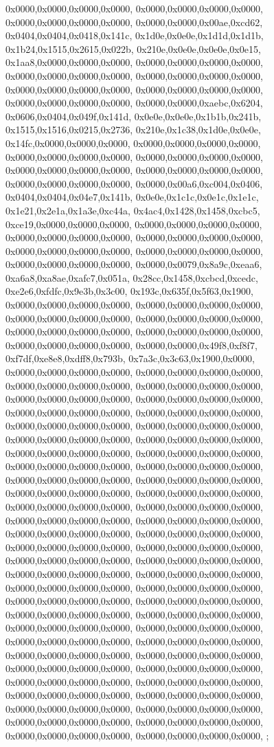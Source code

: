 {	0x0000,0x0000,0x0000,0x0000,
	0x0000,0x0000,0x0000,0x0000,
	0x0000,0x0000,0x0000,0x0000,
	0x0000,0x0000,0x00ae,0xcd62,
	0x0404,0x0404,0x0418,0x141c,
	0x1d0e,0x0e0e,0x1d1d,0x1d1b,
	0x1b24,0x1515,0x2615,0x022b,
	0x210e,0x0e0e,0x0e0e,0x0e15,
	0x1aa8,0x0000,0x0000,0x0000,
	0x0000,0x0000,0x0000,0x0000,
	0x0000,0x0000,0x0000,0x0000,
	0x0000,0x0000,0x0000,0x0000,
	0x0000,0x0000,0x0000,0x0000,
	0x0000,0x0000,0x0000,0x0000,
	0x0000,0x0000,0x0000,0x0000,
	0x0000,0x0000,0xaebc,0x6204,
	0x0606,0x0404,0x049f,0x141d,
	0x0e0e,0x0e0e,0x1b1b,0x241b,
	0x1515,0x1516,0x0215,0x2736,
	0x210e,0x1c38,0x1d0e,0x0e0e,
	0x14fc,0x0000,0x0000,0x0000,
	0x0000,0x0000,0x0000,0x0000,
	0x0000,0x0000,0x0000,0x0000,
	0x0000,0x0000,0x0000,0x0000,
	0x0000,0x0000,0x0000,0x0000,
	0x0000,0x0000,0x0000,0x0000,
	0x0000,0x0000,0x0000,0x0000,
	0x0000,0x00a6,0xc004,0x0406,
	0x0404,0x0404,0x04e7,0x141b,
	0x0e0e,0x1c1c,0x0e1c,0x1e1c,
	0x1e21,0x2e1a,0x1a3e,0xc44a,
	0x4ac4,0x1428,0x1458,0xcbc5,
	0xce19,0x0000,0x0000,0x0000,
	0x0000,0x0000,0x0000,0x0000,
	0x0000,0x0000,0x0000,0x0000,
	0x0000,0x0000,0x0000,0x0000,
	0x0000,0x0000,0x0000,0x0000,
	0x0000,0x0000,0x0000,0x0000,
	0x0000,0x0000,0x0000,0x0000,
	0x0000,0x0079,0x8a9c,0xeaa6,
	0xa6a8,0xa8ae,0xafc7,0x051a,
	0x28cc,0x1458,0xcbcd,0xcedc,
	0xe2e6,0xfdfc,0x9e3b,0x3c00,
	0x193c,0x635f,0x5f63,0x1900,
	0x0000,0x0000,0x0000,0x0000,
	0x0000,0x0000,0x0000,0x0000,
	0x0000,0x0000,0x0000,0x0000,
	0x0000,0x0000,0x0000,0x0000,
	0x0000,0x0000,0x0000,0x0000,
	0x0000,0x0000,0x0000,0x0000,
	0x0000,0x0000,0x0000,0x0000,
	0x0000,0x0000,0x49f8,0xf8f7,
	0xf7df,0xe8e8,0xdff8,0x793b,
	0x7a3c,0x3c63,0x1900,0x0000,
	0x0000,0x0000,0x0000,0x0000,
	0x0000,0x0000,0x0000,0x0000,
	0x0000,0x0000,0x0000,0x0000,
	0x0000,0x0000,0x0000,0x0000,
	0x0000,0x0000,0x0000,0x0000,
	0x0000,0x0000,0x0000,0x0000,
	0x0000,0x0000,0x0000,0x0000,
	0x0000,0x0000,0x0000,0x0000,
	0x0000,0x0000,0x0000,0x0000,
	0x0000,0x0000,0x0000,0x0000,
	0x0000,0x0000,0x0000,0x0000,
	0x0000,0x0000,0x0000,0x0000,
	0x0000,0x0000,0x0000,0x0000,
	0x0000,0x0000,0x0000,0x0000,
	0x0000,0x0000,0x0000,0x0000,
	0x0000,0x0000,0x0000,0x0000,
	0x0000,0x0000,0x0000,0x0000,
	0x0000,0x0000,0x0000,0x0000,
	0x0000,0x0000,0x0000,0x0000,
	0x0000,0x0000,0x0000,0x0000,
	0x0000,0x0000,0x0000,0x0000,
	0x0000,0x0000,0x0000,0x0000,
	0x0000,0x0000,0x0000,0x0000,
	0x0000,0x0000,0x0000,0x0000,
	0x0000,0x0000,0x0000,0x0000,
	0x0000,0x0000,0x0000,0x0000,
	0x0000,0x0000,0x0000,0x0000,
	0x0000,0x0000,0x0000,0x0000,
	0x0000,0x0000,0x0000,0x0000,
	0x0000,0x0000,0x0000,0x0000,
	0x0000,0x0000,0x0000,0x0000,
	0x0000,0x0000,0x0000,0x0000,
	0x0000,0x0000,0x0000,0x0000,
	0x0000,0x0000,0x0000,0x0000,
	0x0000,0x0000,0x0000,0x0000,
	0x0000,0x0000,0x0000,0x0000,
	0x0000,0x0000,0x0000,0x0000,
	0x0000,0x0000,0x0000,0x0000,
	0x0000,0x0000,0x0000,0x0000,
	0x0000,0x0000,0x0000,0x0000,
	0x0000,0x0000,0x0000,0x0000,
	0x0000,0x0000,0x0000,0x0000,
	0x0000,0x0000,0x0000,0x0000,
	0x0000,0x0000,0x0000,0x0000,
	0x0000,0x0000,0x0000,0x0000,
	0x0000,0x0000,0x0000,0x0000,
	0x0000,0x0000,0x0000,0x0000,
	0x0000,0x0000,0x0000,0x0000,
	0x0000,0x0000,0x0000,0x0000,
	0x0000,0x0000,0x0000,0x0000,
	0x0000,0x0000,0x0000,0x0000,
	0x0000,0x0000,0x0000,0x0000,
	0x0000,0x0000,0x0000,0x0000,
	0x0000,0x0000,0x0000,0x0000,
	0x0000,0x0000,0x0000,0x0000,
	0x0000,0x0000,0x0000,0x0000,
};
